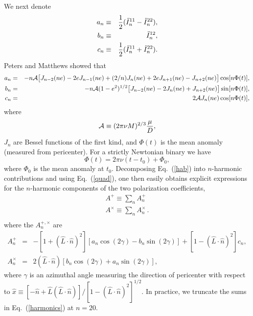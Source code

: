 \documentclass[11pt]{report}
\newcommand {\ban} {\begin{eqnarray}}
\newcommand {\ean} {\end{eqnarray}}
\begin{document}
We next denote
\ban
a_n &\equiv& {1\over 2}(\ddot I^{11}_n - \ddot I^{22}_n), \nonumber\\
b_n &\equiv& \ddot I^{12}_n, \nonumber\\
c_n &\equiv& {1\over 2}(\ddot I^{11}_n + \ddot I^{22}_n). \label{anbncn}
\ean
Peters and Matthews showed \cite{pm} that
\begin{eqnarray} \label{abc}
a_n &=& - n{\cal A}\bigl[J_{n-2}(ne)-2eJ_{n-1}(ne)+(2/n)J_n(ne)
+2eJ_{n+1}(ne)-J_{n+2}(ne)\bigr]\cos[n\Phi(t)],
\nonumber\\
b_n &=& - n{\cal A}(1-e^2)^{1/2}\bigl[J_{n-2}(ne)-2J_{n}(ne)
+J_{n+2}(ne)\bigr]\sin[n \Phi(t)],
\nonumber\\
c_n &=& 2{\cal A}J_n(ne)\cos[n\Phi(t)],
\end{eqnarray}
where
\begin{equation} \label{calA}
{\cal A}\equiv (2\pi \nu M)^{2/3}\frac{\mu}{D} ,
\end{equation}
$J_n$ are Bessel functions of the first kind,
and $\Phi(t)$ is the mean anomaly (measured from pericenter).
For a strictly Newtonian binary we have
\begin{equation} \label{Phi}
\Phi(t) = 2\pi\nu (t-t_0) +\Phi_0,
\end{equation}
where $\Phi_0$ is the mean anomaly at $t_0$.
Decomposing Eq.\ (\ref{hab}) into $n$-harmonic contributions and
using Eq.~(\ref{quad}), one then easily obtains explicit expressions
for the $n$-harmonic components of the two polarization
coefficients, 
\begin{eqnarray}\label{harmonics}
A^{+}\equiv \sum_n A^{+}_n \\
A^{\times}\equiv \sum_n A^{\times}_n \, . \\
\end{eqnarray}
where the $A^{+,\times}_n$ are
\begin{eqnarray} \label{A}
A^{+}_n &=&-[1+({ \hat L}\cdot{ \hat n})^2]\left[
a_n\cos(2\gamma)-b_n\sin(2\gamma)\right]
+[1-({ \hat L}\cdot{ \hat n})^2]c_n, \nonumber\\
A^{\times}_n&=& 2({ \hat L}\cdot{ \hat n})\left[
b_n \cos(2\gamma)+a_n \sin(2\gamma)\right],
\end{eqnarray}
where $\gamma$ is an azimuthal angle measuring the direction of
pericenter with respect to
$\hat x \equiv [-\hat n + \hat L (\hat L\cdot \hat n)]
/[1-(\hat L\cdot \hat n)^2]^{1/2}$.  In practice, we truncate the sums in Eq.~(\ref{harmonics})
at $n=20$.
\end{document}
